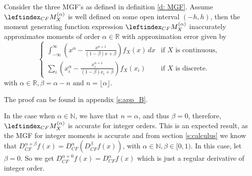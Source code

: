 \begin{theorem}\label{t: MGF_inaccurate}
    Consider the three MGF's as defined in definition \ref{d: MGF}. Assume \(\leftindex_{CF}{M}_X^{(\alpha)}\) is well defined on some open interval \((-h, h)\), then the moment generating function expression \(\leftindex_{CF}{M}_X^{(\alpha)}\) inaccurately approximates moments of order \(\alpha \in \mathbb{R}\) with approximation error given by
    \[
\begin{cases} 
\int_{-\infty}^{\infty} \left(x^\alpha - \displaystyle \frac{x^{n+1} }{(1 - \beta)x + \beta}\right) f_X(x) \, dx & \text{if } X \text{ is continuous,} \\ 
\sum_{i} \left(x_i^\alpha - \displaystyle \frac{x_i^{n+1} }{(1 - \beta)x_i + \beta}\right) f_X(x_i) & \text{if } X \text{ is discrete.} 
\end{cases}
\] with \(\alpha \in \mathbb{R}, \beta = \alpha - n \text{ and } n = \lfloor \alpha \rfloor.\)
    
\end{theorem}
The proof can be found in appendix \ref{s:app_B}.

\begin{remark}
    In the case when \(\alpha \in \mathbb{N}\), we have that \(n = \alpha\), and thus \( \beta = 0\), therefore, \(\leftindex_{CF}{M}_X^{(\alpha)}\) is accurate for integer orders. This is an expected result, as the MGF for integer moments is accurate and from section \ref{s:calculus} we know that \(D_{CF}^{\alpha + \beta}f(x) = D_{CF}^\alpha(D_{CF}^\beta f(x))\), with \(\alpha \in \mathbb{N}, \beta \in [0, 1).\) In this case, let \(\beta = 0\). So we get \(D_{CF}^{\alpha + 0}f(x) = D_{CF}^{\alpha}f(x)\) which is just a regular derivative of integer order.
\end{remark}
